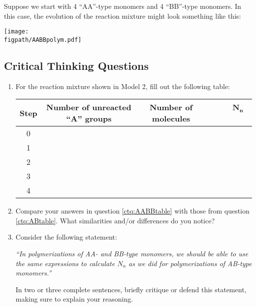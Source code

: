 Suppose we start with 4 ``AA''-type monomers and 4 ``BB''-type monomers.
In this case, the evolution of the reaction mixture might look something like this:

\vspace{0.1in}
\centerline{\texttt{[image: \\figpath/AABBpolym.pdf]}}

\subsection*{Critical Thinking Questions}

	\begin{enumerate}[resume]
		\item \label{ctq:AABBtable} For the reaction mixture shown in Model 2, fill out the following table:
		
			\begin{table}[!h]
				\centering
				\renewcommand{\arraystretch}{3}
				\begin{tabular}{|c|c|c|c|}
					\hline
					\textbf{Step} &  \textbf{Number of unreacted ``A'' groups} & \textbf{Number of molecules} & ~~~~$\mathbf{N_n}$~~~~\\\hline
					0 &&& \\\hline
					1 &&& \\\hline
					2 &&& \\\hline
					3 &&& \\\hline
					4 &&& \\\hline
				\end{tabular}
			\end{table}
			
		\item Compare your answers in question \ref{ctq:AABBtable} with those from question \ref{ctq:ABtable}.  What similarities and/or differences do you notice?
		
		\vspace{1in}
		
		\item Consider the following statement:
		
			\emph{``In polymerizations of AA- and BB-type monomers, we should be able to use the same expressions to calculate $N_n$ as we did for polymerizations of AB-type monomers.''}
			
			In two or three complete sentences, briefly critique or defend this statement, making sure to explain your reasoning.
		
		\vspace{1.5in}
			
	\end{enumerate}
	
